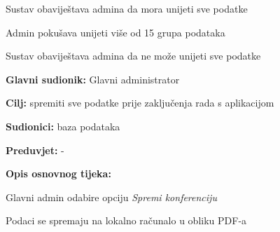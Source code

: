\begin{packed_item}
\begin{packed_item}
\begin{packed_enum}
								\item Sustav obaviještava admina da mora unijeti sve podatke
                                \end{packed_enum}
        
                                \item[3.] Admin pokušava unijeti više od 15 grupa podataka
							\item[] \begin{packed_enum}
								
								\item Sustav obaviještava admina da ne može unijeti sve podatke

                                    \end{packed_enum}
							
						\end{packed_item}
					\end{packed_item}

     \noindent {}
					\begin{packed_item}
	
						\item \textbf{Glavni sudionik: }Glavni administrator

						\item  \textbf{Cilj:} spremiti sve podatke prije zaključenja rada s aplikacijom
						\item  \textbf{Sudionici:} baza podataka
						\item  \textbf{Preduvjet:} -
						\item  \textbf{Opis osnovnog tijeka:}
						
						\item[] \begin{packed_enum}
	
							\item Glavni admin odabire opciju \textit{Spremi konferenciju}
							\item Podaci se spremaju na lokalno računalo u obliku PDF-a
							
						\end{packed_enum}
						
						
						\end{packed_item}

